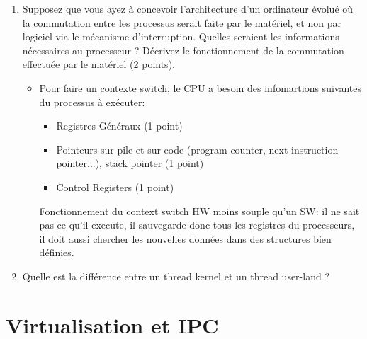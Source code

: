 \begin{enumerate}

\item Supposez que vous ayez à concevoir l'architecture d'un ordinateur évolué où la commutation entre les processus serait faite par le matériel, et non par logiciel via le mécanisme d'interruption. Quelles seraient les informations nécessaires au processeur ? Décrivez le fonctionnement de la commutation effectuée par le matériel (2 points).

\begin{correction}
\begin{itemize}
  \item Pour faire un contexte switch, le CPU a besoin des infomartions suivantes du processus à exécuter:
  \begin{itemize}
    \item Registres Généraux (1 point)
    \item Pointeurs sur pile et sur code (program counter, next instruction pointer...), stack pointer (1 point)
    \item Control Registers (1 point)
  \end{itemize}
  Fonctionnement du context switch HW moins souple qu'un SW: il ne sait pas ce qu'il execute, il sauvegarde donc tous les registres du processeurs, il doit aussi chercher les nouvelles données dans des structures bien définies.
\end{itemize}
\end{correction}


\item Quelle est la différence entre un thread kernel et un thread user-land ?

\end{enumerate}



\section{{Virtualisation et IPC}
         {\hfill{} }}

